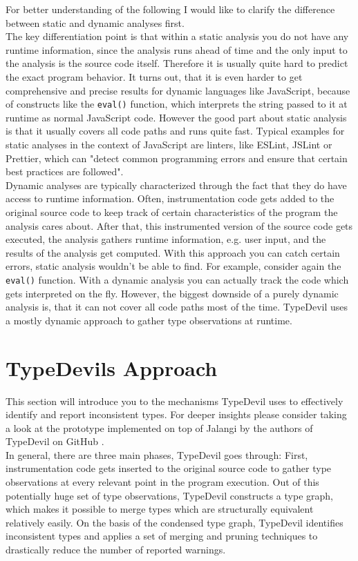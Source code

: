 \documentclass[runningheads,a4paper]{llncs}
\begin{document}
For better understanding of the following I would like to clarify the difference between static and dynamic analyses first.\\
The key differentiation point is that within a static analysis you do not have any runtime information, since the analysis runs ahead of time and the only input to the analysis is the source code itself.
Therefore it is usually quite hard to predict the exact program behavior.
It turns out, that it is even harder to get comprehensive and precise results for dynamic languages like JavaScript, because of constructs like the \lstinline[columns=fixed]{eval()} function, which interprets the string passed to it at runtime as normal JavaScript code. 
However the good part about static analysis is that it usually covers all code paths and runs quite fast.
Typical examples for static analyses in the context of JavaScript are linters, like ESLint, JSLint or Prettier, which can "detect common programming errors and ensure that certain best practices are followed". \\
Dynamic analyses are typically characterized through the fact that they do have access to runtime information.
Often, instrumentation code gets added to the original source code to keep track of certain characteristics of the program the analysis cares about.
After that, this instrumented version of the source code gets executed, the analysis gathers runtime information, e.g. user input, and the results of the analysis get computed.
With this approach you can catch certain errors, static analysis wouldn't be able to find.
For example, consider again the \lstinline[columns=fixed]{eval()} function.
With a dynamic analysis you can actually track the code which gets interpreted on the fly.
However, the biggest downside of a purely dynamic analysis is, that it can not cover all code paths most of the time.
TypeDevil uses a mostly dynamic approach to gather type observations at runtime.

\section{TypeDevils Approach}

This section will introduce you to the mechanisms TypeDevil uses to effectively identify and report inconsistent types.
For deeper insights please consider taking a look at the prototype implemented on top of Jalangi \cite{DBLP:conf/sigsoft/SenKBG13a} by the authors of TypeDevil on GitHub \cite{TypeDevilGitHub}.\\
In general, there are three main phases, TypeDevil goes through: 
First, instrumentation code gets inserted to the original source code to gather type observations at every relevant point in the program execution.
Out of this potentially huge set of type observations, TypeDevil constructs a type graph, which makes it possible to merge types which are structurally equivalent relatively easily.
On the basis of the condensed type graph, TypeDevil identifies inconsistent types and applies a set of merging and pruning techniques to drastically reduce the number of reported warnings.
\end{document}

